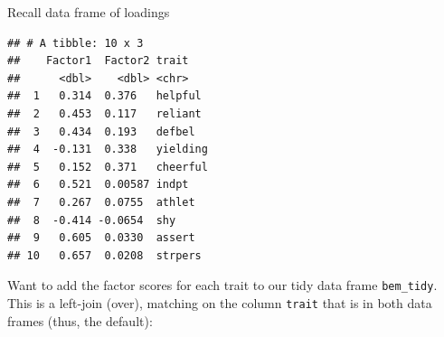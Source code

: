 \documentclass[
  ignorenonframetext,
]{beamer}
\newenvironment{Shaded}{\begin{snugshade}}{\end{snugshade}}
\newcommand{\DecValTok}[1]{\textcolor[rgb]{0.00,0.00,0.81}{#1}}
\newcommand{\KeywordTok}[1]{\textcolor[rgb]{0.13,0.29,0.53}{\textbf{#1}}}
\newcommand{\NormalTok}[1]{#1}
\newcommand{\OperatorTok}[1]{\textcolor[rgb]{0.81,0.36,0.00}{\textbf{#1}}}
\newcommand{\StringTok}[1]{\textcolor[rgb]{0.31,0.60,0.02}{#1}}
\begin{document}
\begin{frame}[fragile]{Recall data frame of loadings}
\protect\hypertarget{recall-data-frame-of-loadings}{}

\footnotesize

\begin{Shaded}
\end{Shaded}

\begin{verbatim}
## # A tibble: 10 x 3
##    Factor1  Factor2 trait   
##      <dbl>    <dbl> <chr>   
##  1   0.314  0.376   helpful 
##  2   0.453  0.117   reliant 
##  3   0.434  0.193   defbel  
##  4  -0.131  0.338   yielding
##  5   0.152  0.371   cheerful
##  6   0.521  0.00587 indpt   
##  7   0.267  0.0755  athlet  
##  8  -0.414 -0.0654  shy     
##  9   0.605  0.0330  assert  
## 10   0.657  0.0208  strpers
\end{verbatim}

\normalsize

Want to add the factor scores for each trait to our tidy data frame
\texttt{bem\_tidy}. This is a left-join (over), matching on the column
\texttt{trait} that is in both data frames (thus, the default):

\end{frame}
\end{document}
